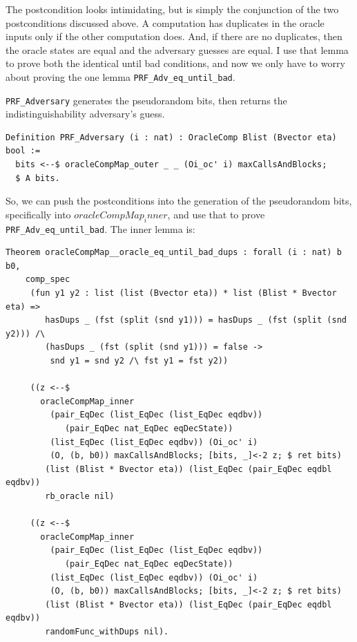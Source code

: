 \documentclass[12pt,lot, lof]{puthesis}
\newcommand{\li} {\lstinline}
\begin{document}
{%
The postcondition looks intimidating, but is simply the conjunction of the two postconditions discussed above. A computation has duplicates in the oracle inputs only if the other computation does. And, if there are no duplicates, then the oracle states are equal and the adversary guesses are equal. I use that lemma to prove both the identical until bad conditions, and now we only have to worry about proving the one lemma \li|PRF_Adv_eq_until_bad|.

\li|PRF_Adversary| generates the pseudorandom bits, then returns the indistinguishability adversary's guess. 

\begin{lstlisting}
Definition PRF_Adversary (i : nat) : OracleComp Blist (Bvector eta) bool :=
  bits <--$ oracleCompMap_outer _ _ (Oi_oc' i) maxCallsAndBlocks;
  $ A bits.
\end{lstlisting}

So, we can push the postconditions into the generation of the pseudorandom bits, specifically into $oracleCompMap_inner$, and use that to prove \li|PRF_Adv_eq_until_bad|. The inner lemma is:

\begin{lstlisting}
Theorem oracleCompMap__oracle_eq_until_bad_dups : forall (i : nat) b b0,
    comp_spec
     (fun y1 y2 : list (list (Bvector eta)) * list (Blist * Bvector eta) =>
        hasDups _ (fst (split (snd y1))) = hasDups _ (fst (split (snd y2))) /\
        (hasDups _ (fst (split (snd y1))) = false ->
         snd y1 = snd y2 /\ fst y1 = fst y2))

     ((z <--$
       oracleCompMap_inner
         (pair_EqDec (list_EqDec (list_EqDec eqdbv))
            (pair_EqDec nat_EqDec eqDecState))
         (list_EqDec (list_EqDec eqdbv)) (Oi_oc' i) 
         (O, (b, b0)) maxCallsAndBlocks; [bits, _]<-2 z; $ ret bits)
        (list (Blist * Bvector eta)) (list_EqDec (pair_EqDec eqdbl eqdbv))
        rb_oracle nil)
         
     ((z <--$
       oracleCompMap_inner
         (pair_EqDec (list_EqDec (list_EqDec eqdbv))
            (pair_EqDec nat_EqDec eqDecState))
         (list_EqDec (list_EqDec eqdbv)) (Oi_oc' i) 
         (O, (b, b0)) maxCallsAndBlocks; [bits, _]<-2 z; $ ret bits)
        (list (Blist * Bvector eta)) (list_EqDec (pair_EqDec eqdbl eqdbv))
        randomFunc_withDups nil).
\end{lstlisting}        

}
\end{document}
